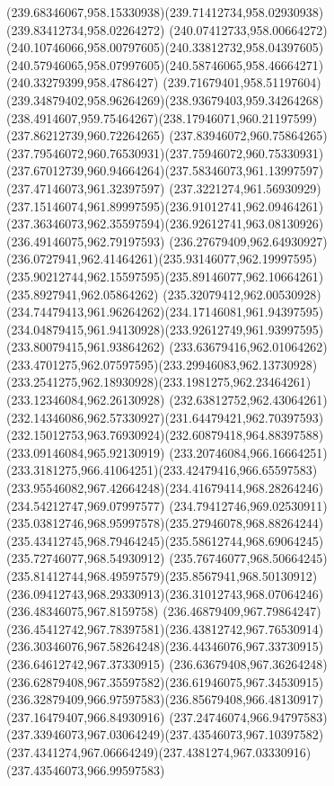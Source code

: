 {{		\curveto(239.68346067,958.15330938)(239.71412734,958.02930938)(239.83412734,958.02264272)
		\curveto(240.07412733,958.00664272)(240.10746066,958.00797605)(240.33812732,958.04397605)
		\curveto(240.57946065,958.07997605)(240.58746065,958.46664271)(240.33279399,958.4786427)
		\curveto(239.71679401,958.51197604)(239.34879402,958.96264269)(238.93679403,959.34264268)
		\curveto(238.4914607,959.75464267)(238.17946071,960.21197599)(237.86212739,960.72264265)
		\curveto(237.83946072,960.75864265)(237.79546072,960.76530931)(237.75946072,960.75330931)
		\curveto(237.67012739,960.94664264)(237.58346073,961.13997597)(237.47146073,961.32397597)
		\curveto(237.3221274,961.56930929)(237.15146074,961.89997595)(236.91012741,962.09464261)
		\curveto(237.36346073,962.35597594)(236.92612741,963.08130926)(236.49146075,962.79197593)
		\curveto(236.27679409,962.64930927)(236.0727941,962.41464261)(235.93146077,962.19997595)
		\curveto(235.90212744,962.15597595)(235.89146077,962.10664261)(235.8927941,962.05864262)
		\curveto(235.32079412,962.00530928)(234.74479413,961.96264262)(234.17146081,961.94397595)
		\curveto(234.04879415,961.94130928)(233.92612749,961.93997595)(233.80079415,961.93864262)
		\curveto(233.63679416,962.01064262)(233.4701275,962.07597595)(233.29946083,962.13730928)
		\curveto(233.2541275,962.18930928)(233.1981275,962.23464261)(233.12346084,962.26130928)
		\curveto(232.63812752,962.43064261)(232.14346086,962.57330927)(231.64479421,962.70397593)
		\curveto(232.15012753,963.76930924)(232.60879418,964.88397588)(233.09146084,965.92130919)
		\curveto(233.20746084,966.16664251)(233.3181275,966.41064251)(233.42479416,966.65597583)
		\curveto(233.95546082,967.42664248)(234.41679414,968.28264246)(234.54212747,969.07997577)
		\curveto(234.79412746,969.02530911)(235.03812746,968.95997578)(235.27946078,968.88264244)
		\curveto(235.43412745,968.79464245)(235.58612744,968.69064245)(235.72746077,968.54930912)
		\curveto(235.76746077,968.50664245)(235.81412744,968.49597579)(235.8567941,968.50130912)
		\curveto(236.09412743,968.29330913)(236.31012743,968.07064246)(236.48346075,967.8159758)
		\curveto(236.46879409,967.79864247)(236.45412742,967.78397581)(236.43812742,967.76530914)
		\curveto(236.30346076,967.58264248)(236.44346076,967.33730915)(236.64612742,967.37330915)
		\curveto(236.63679408,967.36264248)(236.62879408,967.35597582)(236.61946075,967.34530915)
		\curveto(236.32879409,966.97597583)(236.85679408,966.48130917)(237.16479407,966.84930916)
		\curveto(237.24746074,966.94797583)(237.33946073,967.03064249)(237.43546073,967.10397582)
		\curveto(237.4341274,967.06664249)(237.4381274,967.03330916)(237.43546073,966.99597583)
}}
